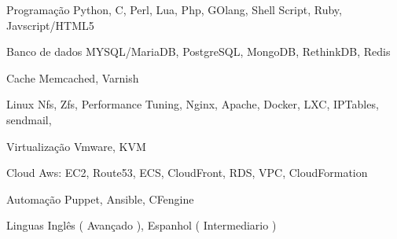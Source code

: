 

\begin{cvskills}

  \cvskill
    {Programação} %
    {Python, C, Perl, Lua, Php, GOlang, Shell Script, Ruby, Javscript/HTML5} %

  \cvskill
    {Banco de dados} %
    {MYSQL/MariaDB, PostgreSQL, MongoDB, RethinkDB, Redis} %

  \cvskill
    {Cache} %
    {Memcached, Varnish} %

\cvskill
    {Linux} %
    {Nfs, Zfs, Performance Tuning, Nginx, Apache, Docker, LXC, IPTables, sendmail, } %

\cvskill
    {Virtualização} %
    {Vmware, KVM} %

\cvskill
  {Cloud} %
  {Aws: EC2, Route53, ECS, CloudFront, RDS, VPC, CloudFormation} %

\cvskill
  {Automação} %
  {Puppet, Ansible, CFengine} %

\cvskill
  {Linguas} %
  {Inglês ( Avançado ), Espanhol ( Intermediario )} %

\end{cvskills}
